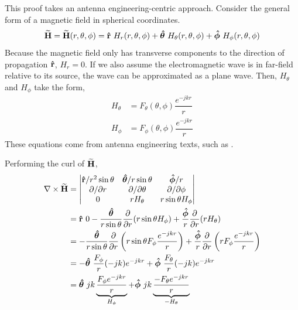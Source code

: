 \begin{proofBox} \label{proof:GeneralRelation_E_H}
    This proof takes an antenna engineering-centric approach. Consider the general form of a magnetic field in spherical coordinates.
    $$ \vecphasor{H} = \vecphasor{H}(r,\theta,\phi) = \uvec{r}\ H_r(r,\theta,\phi)  + \uvec{\theta}\ H_\theta(r,\theta,\phi)  + \uvec{\phi}\ H_\phi(r,\theta,\phi)  $$
    Because the magnetic field only has transverse components to the direction of propagation $\boldsymbol{{\mathrm{\hat{r}}}}$, $H_r = 0$. If we also assume the electromagnetic wave is in far-field relative to its source, the wave can be approximated as a plane wave. Then, $H_\theta$ and $H_\phi$ take the form, 
    \begin{align*}
        H_\theta  &= F_\theta(\theta,\phi) \dfrac{e^{-jkr}}{r} \\
         H_\phi  &= F_\phi(\theta,\phi) \dfrac{e^{-jkr}}{r}
    \end{align*}
    These equations come from antenna engineering texts, such as \cite{Balanis-2012-antenna}. \par 
    Performing the curl of $\boldsymbol{\mathrm{\widetilde{H}}}$, 
    \begin{align*}
        \nabla \times \boldsymbol{\mathrm{\widetilde{H}}} &= 
        \begin{vmatrix}
            \boldsymbol{{\mathrm{\hat{r}}}}/r^2\sin\theta & \boldsymbol{{\mathrm{\hat{\theta}}}}/r\sin\theta & \boldsymbol{{\mathrm{\hat{\phi}}}}/r \\ 
            \partial/\partial r & \partial/\partial \theta & \partial/\partial \phi \\ 
            0 & r H_\theta & r \sin\theta H_\phi
        \end{vmatrix} \\ 
        &= \boldsymbol{{\mathrm{\hat{r}}}} \ 0 - \dfrac{\boldsymbol{{\mathrm{\hat{\theta}}}}}{r\sin\theta}\dfrac{\partial}{\partial r} (r\sin\theta H_\phi) + \dfrac{\boldsymbol{{\mathrm{\hat{\phi}}}}}{r} \dfrac{\partial}{\partial r}(r H_\theta) \\
        &=  - \dfrac{\boldsymbol{{\mathrm{\hat{\theta}}}}}{r\sin\theta}\dfrac{\partial}{\partial r} \left(r\sin\theta F_\phi \dfrac{e^{-jkr}}{r}\right) + \dfrac{\boldsymbol{{\mathrm{\hat{\phi}}}}}{r} \dfrac{\partial}{\partial r}\left(r F_\phi \dfrac{e^{-jkr}}{r} \right) \\ 
        &= - \boldsymbol{{\mathrm{\hat{\theta}}}} \ \dfrac{F_\phi}{r} (-jk) e^{-jkr} + \boldsymbol{{\mathrm{\hat{\phi}}}} \ \dfrac{F_\theta}{r} (-jk) e^{-jkr} \\ 
        &= \boldsymbol{{\mathrm{\hat{\theta}}}}\ jk \underbrace{\dfrac{F_\phi e^{-jkr}}{r}}_{H_\phi} + \boldsymbol{{\mathrm{\hat{\phi}}}} \ jk \underbrace{\dfrac{-F_\theta e^{-jkr}}{r}}_{-H_\theta} 
    \end{align*}

\end{proofBox}
